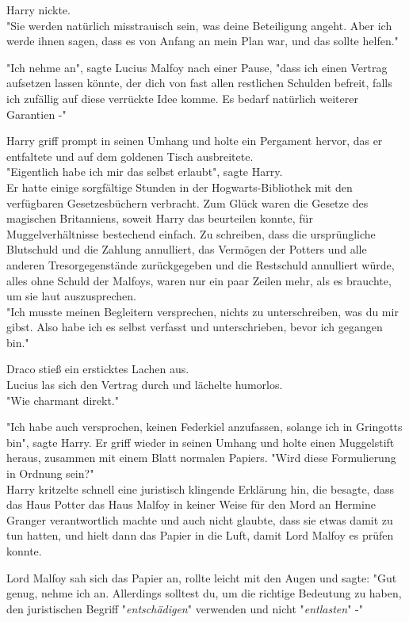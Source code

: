 {Harry nickte.\\ "Sie werden natürlich misstrauisch sein, was deine Beteiligung angeht. Aber ich werde ihnen sagen, dass es von Anfang an mein Plan war, und das sollte helfen."

"Ich nehme an", sagte Lucius Malfoy nach einer Pause, "dass ich einen Vertrag aufsetzen lassen könnte, der dich von fast allen restlichen Schulden befreit, falls ich zufällig auf diese verrückte Idee komme. Es bedarf natürlich weiterer Garantien -"

Harry griff prompt in seinen Umhang und holte ein Pergament hervor, das er entfaltete und auf dem goldenen Tisch ausbreitete.\\ "Eigentlich habe ich mir das selbst erlaubt", sagte Harry.\\ Er hatte einige sorgfältige Stunden in der Hogwarts-Bibliothek mit den verfügbaren Gesetzesbüchern verbracht. Zum Glück waren die Gesetze des magischen Britanniens, soweit Harry das beurteilen konnte, für Muggelverhältnisse bestechend einfach. Zu schreiben, dass die ursprüngliche Blutschuld und die Zahlung annulliert, das Vermögen der Potters und alle anderen Tresorgegenstände zurückgegeben und die Restschuld annulliert würde, alles ohne Schuld der Malfoys, waren nur ein paar Zeilen mehr, als es brauchte, um sie laut auszusprechen.\\ "Ich musste meinen Begleitern versprechen, nichts zu unterschreiben, was du mir gibst. Also habe ich es selbst verfasst und unterschrieben, bevor ich gegangen bin."

Draco stieß ein ersticktes Lachen aus.\\ Lucius las sich den Vertrag durch und lächelte humorlos.\\ "Wie charmant direkt."

"Ich habe auch versprochen, keinen Federkiel anzufassen, solange ich in Gringotts bin", sagte Harry. Er griff wieder in seinen Umhang und holte einen Muggelstift heraus, zusammen mit einem Blatt normalen Papiers. "Wird diese Formulierung in Ordnung sein?"\\ Harry kritzelte schnell eine juristisch klingende Erklärung hin, die besagte, dass das Haus Potter das Haus Malfoy in keiner Weise für den Mord an Hermine Granger verantwortlich machte und auch nicht glaubte, dass sie etwas damit zu tun hatten, und hielt dann das Papier in die Luft, damit Lord Malfoy es prüfen konnte.

Lord Malfoy sah sich das Papier an, rollte leicht mit den Augen und sagte: "Gut genug, nehme ich an. Allerdings solltest du, um die richtige Bedeutung zu haben, den juristischen Begriff "\emph{entschädigen}" verwenden und nicht "\emph{entlasten}" -"

}
